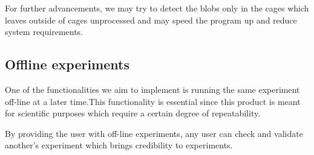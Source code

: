 For further advancements, we may try to detect the blobs only in the cages which leaves outside of cages unprocessed and may speed the program up and reduce system requirements.

\subsection{Offline experiments}
One of the functionalities we aim to implement is running the same experiment off-line at a later time.This functionality is essential since this product is meant for scientific purposes which require a certain degree of repeatability.

By providing the user with off-line experiments, any user can check and validate another's experiment which brings credibility to experiments.

